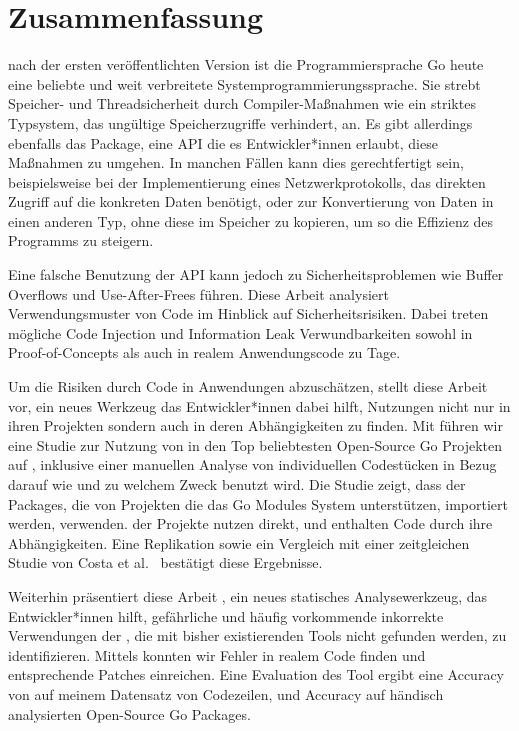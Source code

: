 \chapter*{Zusammenfassung}

 nach der ersten veröffentlichten Version ist die Programmiersprache Go heute eine beliebte und
weit verbreitete Systemprogrammierungssprache.
Sie strebt Speicher- und Threadsicherheit durch Compiler-Maßnahmen wie ein striktes Typsystem, das
ungültige Speicherzugriffe verhindert, an.
Es gibt allerdings ebenfalls das \unsafe{} Package, eine API die es Entwickler*innen erlaubt, diese
Maßnahmen zu umgehen.
In manchen Fällen kann dies gerechtfertigt sein, beispielsweise bei der Implementierung eines
Netzwerkprotokolls, das direkten Zugriff auf die konkreten Daten benötigt, oder zur Konvertierung von Daten in einen
anderen Typ, ohne diese im Speicher zu kopieren, um so die Effizienz des Programms zu steigern.

Eine falsche Benutzung der \unsafe{} API kann jedoch zu Sicherheitsproblemen wie Buffer Overflows und Use-After-Frees
führen.
Diese Arbeit analysiert Verwendungsmuster von \unsafe{} Code im Hinblick auf Sicherheitsrisiken.
Dabei treten mögliche Code Injection und Information Leak Verwundbarkeiten sowohl in Proof-of-Concepts als auch in
realem Anwendungscode zu Tage.

Um die Risiken durch \unsafe{} Code in Anwendungen abzuschätzen, stellt diese Arbeit \toolGeiger{} vor, ein neues
Werkzeug das Entwickler*innen dabei hilft, \unsafe{} Nutzungen nicht nur in ihren Projekten sondern auch in deren
Abhängigkeiten zu finden.
Mit \toolGeiger{} führen wir eine Studie zur Nutzung von \unsafe{} in den Top \projsTotal{} beliebtesten Open-Source Go
Projekten auf \github{}, inklusive einer manuellen Analyse von \numberLabeledCodeSnippets{} individuellen Codestücken
in Bezug darauf wie und zu welchem Zweck \unsafe{} benutzt wird.
Die Studie zeigt, dass \percentageUnsafePackages{} der Packages, die von Projekten die das Go Modules System
unterstützen, importiert werden, \unsafe{} verwenden.
\percentageUnsafeProjects{} der Projekte nutzen \unsafe{} direkt, und \percentageUnsafeTransitiveWithDependencies{}
enthalten \unsafe{} Code durch ihre Abhängigkeiten.
Eine Replikation sowie ein Vergleich mit einer zeitgleichen Studie von Costa et al.~\cite{costa2020} bestätigt diese
Ergebnisse.

Weiterhin präsentiert diese Arbeit \toolSafer{}, ein neues statisches Analysewerkzeug, das Entwickler*innen hilft,
 gefährliche und häufig vorkommende inkorrekte Verwendungen der \unsafe{}, die mit bisher existierenden
Tools nicht gefunden werden, zu identifizieren.
Mittels \toolSafer{} konnten wir \numberBugsFixed{} Fehler in realem Code finden und entsprechende Patches einreichen.
Eine Evaluation des Tool ergibt eine Accuracy von \goSaferEvaluationDatasetGosaferAccuracy{} auf meinem Datensatz von
\unsafe{} Codezeilen, und \goSaferEvaluationPackagesGosaferAccuracy{} Accuracy auf händisch analysierten Open-Source
Go Packages.
